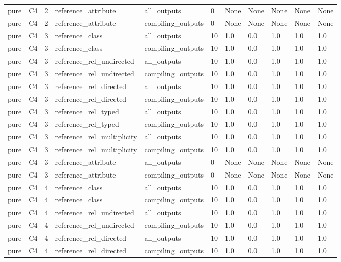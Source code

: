 \begin{tabular}{lllllllllll}
pure & C4 & 2 & reference\_attribute & all\_outputs & 0 & None & None & None & None & None \\
pure & C4 & 2 & reference\_attribute & compiling\_outputs & 0 & None & None & None & None & None \\
pure & C4 & 3 & reference\_class & all\_outputs & 10 & 1.0 & 0.0 & 1.0 & 1.0 & 1.0 \\
pure & C4 & 3 & reference\_class & compiling\_outputs & 10 & 1.0 & 0.0 & 1.0 & 1.0 & 1.0 \\
pure & C4 & 3 & reference\_rel\_undirected & all\_outputs & 10 & 1.0 & 0.0 & 1.0 & 1.0 & 1.0 \\
pure & C4 & 3 & reference\_rel\_undirected & compiling\_outputs & 10 & 1.0 & 0.0 & 1.0 & 1.0 & 1.0 \\
pure & C4 & 3 & reference\_rel\_directed & all\_outputs & 10 & 1.0 & 0.0 & 1.0 & 1.0 & 1.0 \\
pure & C4 & 3 & reference\_rel\_directed & compiling\_outputs & 10 & 1.0 & 0.0 & 1.0 & 1.0 & 1.0 \\
pure & C4 & 3 & reference\_rel\_typed & all\_outputs & 10 & 1.0 & 0.0 & 1.0 & 1.0 & 1.0 \\
pure & C4 & 3 & reference\_rel\_typed & compiling\_outputs & 10 & 1.0 & 0.0 & 1.0 & 1.0 & 1.0 \\
pure & C4 & 3 & reference\_rel\_multiplicity & all\_outputs & 10 & 1.0 & 0.0 & 1.0 & 1.0 & 1.0 \\
pure & C4 & 3 & reference\_rel\_multiplicity & compiling\_outputs & 10 & 1.0 & 0.0 & 1.0 & 1.0 & 1.0 \\
pure & C4 & 3 & reference\_attribute & all\_outputs & 0 & None & None & None & None & None \\
pure & C4 & 3 & reference\_attribute & compiling\_outputs & 0 & None & None & None & None & None \\
pure & C4 & 4 & reference\_class & all\_outputs & 10 & 1.0 & 0.0 & 1.0 & 1.0 & 1.0 \\
pure & C4 & 4 & reference\_class & compiling\_outputs & 10 & 1.0 & 0.0 & 1.0 & 1.0 & 1.0 \\
pure & C4 & 4 & reference\_rel\_undirected & all\_outputs & 10 & 1.0 & 0.0 & 1.0 & 1.0 & 1.0 \\
pure & C4 & 4 & reference\_rel\_undirected & compiling\_outputs & 10 & 1.0 & 0.0 & 1.0 & 1.0 & 1.0 \\
pure & C4 & 4 & reference\_rel\_directed & all\_outputs & 10 & 1.0 & 0.0 & 1.0 & 1.0 & 1.0 \\
pure & C4 & 4 & reference\_rel\_directed & compiling\_outputs & 10 & 1.0 & 0.0 & 1.0 & 1.0 & 1.0 \\

\end{tabular}
